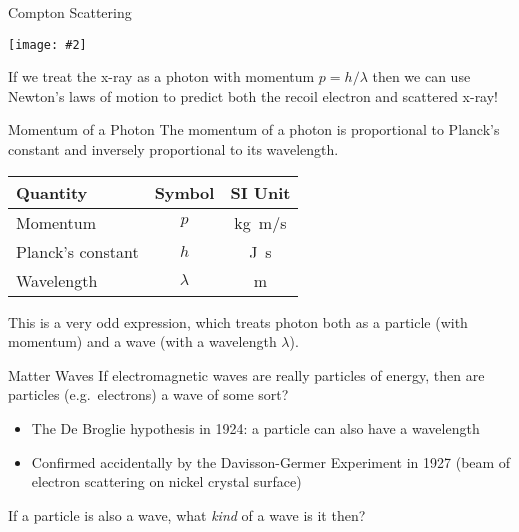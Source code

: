 \documentclass[12pt,compress,aspectratio=169]{beamer}
\newcommand{\pic}[2]{\texttt{[image: \#2]}}
\newcommand{\eq}[2]{\vspace{#1}{\Large\begin{displaymath}#2\end{displaymath}}}
\begin{document}
\begin{frame}{Compton Scattering}
  \begin{center}
    \pic{.5}{compton2}
  \end{center}
  If we treat the x-ray as a photon with momentum $p=h/\lambda$ then we can
  use Newton's laws of motion to predict both the recoil electron and scattered
  x-ray!
\end{frame}



\begin{frame}{Momentum of a Photon}
  The momentum of a photon is proportional to Planck's constant and 
  inversely proportional to its wavelength.

  \eq{-.2in}{
    \boxed{p=\frac{h}{\lambda}}
  }
  \begin{center}
    \begin{tabular}{l|c|c}
      \rowcolor{pink}
      \textbf{Quantity} & \textbf{Symbol} & \textbf{SI Unit} \\ \hline
      Momentum          & $p$ & \si{\kilo\gram.\metre/\second}\\
      Planck's constant & $h$ & \si{\joule.\second}\\
      Wavelength        & $\lambda$ & \si{\metre}
    \end{tabular}
  \end{center}
  This is a very odd expression, which treats photon both as a particle (with
  momentum) and a wave (with a wavelength $\lambda$).
\end{frame}




\begin{frame}{Matter Waves}
  If electromagnetic waves are really particles of energy, then are particles
  (e.g.\ electrons) a wave of some sort?
  \begin{itemize}
  \item The De Broglie hypothesis in 1924: a particle can also have a
    wavelength
  \item Confirmed accidentally by the Davisson-Germer Experiment in 1927 (beam
    of electron scattering on nickel crystal surface)
  \end{itemize}

  \vspace{.1in}If a particle is also a wave, what \emph{kind} of a wave is it
  then?
\end{frame}
\end{document}
